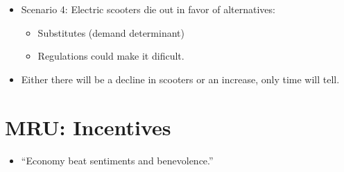 \documentclass{article}
\begin{document}
\begin{itemize}
    \item Scenario 4: Electric scooters die out in favor of alternatives:
        \begin{itemize}
            \item Substitutes (demand determinant)
            \item Regulations could make it dificult. 
        \end{itemize}
    
    \item Either there will be a decline in scooters or an increase, only time will tell.
\end{itemize}

\section{MRU: Incentives}
\begin{itemize}
    \item ``Economy beat sentiments and benevolence.''
\end{itemize}
\end{document}
